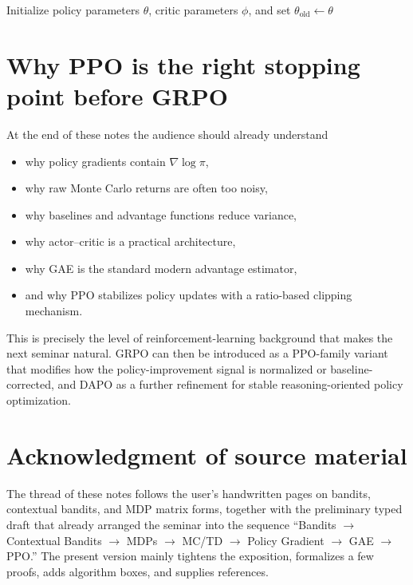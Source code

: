 \documentclass[11pt]{article}
\newcommand{\1}{\mathbf{1}}
\begin{document}
\begin{algorithm}[htbp]
\caption{PPO}
Initialize policy parameters $\theta$, critic parameters $\phi$, and set $\theta_{\mathrm{old}}\gets\theta$\;
\end{algorithm}

\section{Why PPO is the right stopping point before GRPO}

At the end of these notes the audience should already understand
\begin{itemize}
    \item why policy gradients contain $\nabla\log\pi$,
    \item why raw Monte Carlo returns are often too noisy,
    \item why baselines and advantage functions reduce variance,
    \item why actor--critic is a practical architecture,
    \item why GAE is the standard modern advantage estimator,
    \item and why PPO stabilizes policy updates with a ratio-based clipping mechanism.
\end{itemize}
This is precisely the level of reinforcement-learning background that makes the next seminar natural. GRPO can then be introduced as a PPO-family variant that modifies how the policy-improvement signal is normalized or baseline-corrected, and DAPO as a further refinement for stable reasoning-oriented policy optimization.

\section*{Acknowledgment of source material}

The thread of these notes follows the user's handwritten pages on bandits, contextual bandits, and MDP matrix forms, together with the preliminary typed draft that already arranged the seminar into the sequence ``Bandits $\rightarrow$ Contextual Bandits $\rightarrow$ MDPs $\rightarrow$ MC/TD $\rightarrow$ Policy Gradient $\rightarrow$ GAE $\rightarrow$ PPO.'' The present version mainly tightens the exposition, formalizes a few proofs, adds algorithm boxes, and supplies references.
\end{document}
